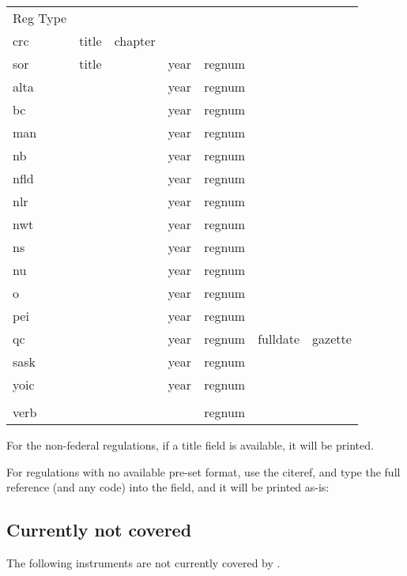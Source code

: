 \begin{tabular}{lllllll}
Reg Type &  & &&&& \\
crc & title & chapter &&&& \\
sor & title && year & regnum && \\
alta & && year & regnum && \\
bc &  && year & regnum && \\
man & && year & regnum && \\
nb &  && year & regnum && \\
nfld &  && year & regnum && \\
nlr &  && year & regnum && \\
nwt &  && year & regnum && \\
ns &  && year & regnum && \\
nu &  && year & regnum && \\
o &  && year & regnum && \\
pei &  && year & regnum && \\
qc &  && year & regnum & fulldate & gazette\\
sask &  && year & regnum && \\
yoic &  && year & regnum && \\
\\
verb &  &&  & regnum && \\
\end{tabular}
\bigskip

\p For the non-federal regulations, if a title field is available, it will be printed.
\bigskip

\p For regulations with no available pre-set format, use the  citeref, and type the full reference (and any code) into the  field, and it will be printed as-is:


%


\subsection{Currently not covered}
\p The following instruments are not currently covered by .

